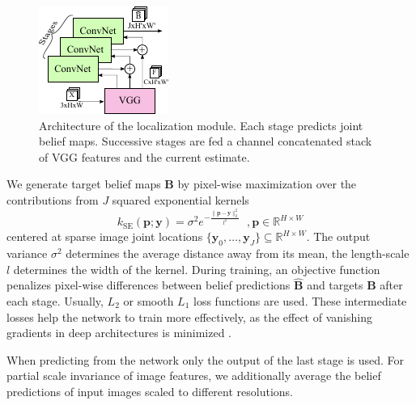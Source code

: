 \documentclass[conference]{IEEEtran}
\begin{document}
    \begin{figure} [!h]
        \centering
        \includegraphics[width=0.7\columnwidth]{figures/joint_model/joint_model.pdf}
        \caption {
            \label{fig:jointmodel} 
            Architecture of the localization module. Each stage predicts joint belief maps. Successive stages are fed a channel concatenated stack of VGG features and the current estimate.
        }
    \end{figure}

    We generate target belief maps $\mathbf{B}$ by pixel-wise maximization over the contributions from $J$ squared exponential kernels
    \begin{equation}
        k_{\textrm{SE}}(\mathbf{p};\mathbf{y}) = \sigma^2e^{-\frac{\lVert \mathbf{p} - \mathbf{y} \rVert^2_2}{l^2}} \;\;,{\mathbf{p} \in \mathbb{R}^{H\times W}}
    \end{equation}
    centered at sparse image joint locations ${\{\mathbf{y}_0,\ldots,\mathbf{y}_J\} \subseteq \mathbb{R}^{H\times W}}$. The output variance $\sigma^2$ determines the average distance away from its mean, the length-scale $l$ determines the width of the kernel. During training, an objective function penalizes pixel-wise differences between belief predictions $\hat{\mathbf{B}}$ and targets $\mathbf{B}$ after each stage. Usually, $L_2$ or smooth $L_1$ loss functions are used. These intermediate losses help the network to train more effectively, as the effect of vanishing gradients in deep architectures is minimized \cite{newell2016stacked, wei2016convolutional}. 
    
    When predicting from the network only the output of the last stage is used. For partial scale invariance of image features, we additionally average the belief predictions of input images scaled to different resolutions.
\end{document}
